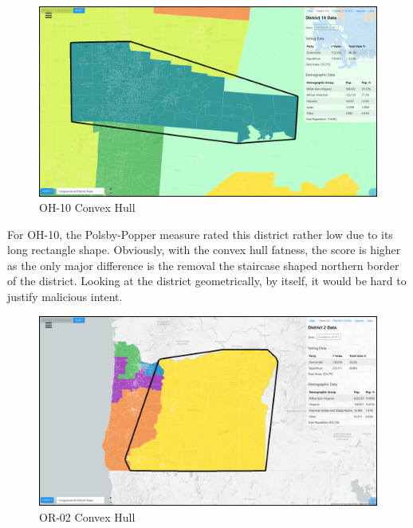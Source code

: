 \documentclass[letterpaper]{article}
\begin{document}
\begin{figure}[H]
	\includegraphics[width=\linewidth]{./figures/OH-10-ConvexHull.png}
	\caption{OH-10 Convex Hull}
	\label{fig:oh10convexHull}
\end{figure}

For OH-10, the Polsby-Popper measure rated this district rather low due to its long rectangle shape. Obviously, with the convex hull fatness, the score is higher as the only major difference is the removal the staircase shaped northern border of the district. Looking at the district geometrically, by itself, it would be hard to justify malicious intent.

\begin{figure}[H]
	\includegraphics[width=\linewidth]{./figures/OR-02-ConvexHull.png}
	\caption{OR-02 Convex Hull}
	\label{fig:or02convexHull}
\end{figure}
\end{document}
